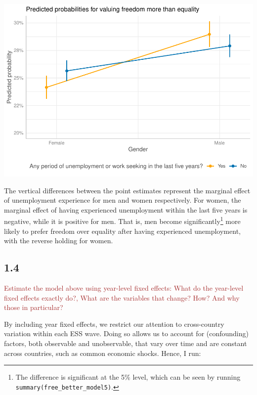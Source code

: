 \documentclass[
]{article}
\begin{document}
\includegraphics{AVCD-Assignment3-Edenhofer_files/figure-latex/predicted-probabilities-plot-1.pdf}

The vertical differences between the point estimates represent the
marginal effect of unemployment experience for men and women
respectively. For women, the marginal effect of having experienced
unemployment within the last five years is negative, while it is
positive for men. That is, men become significantly\footnote{The
  difference is significant at the 5\% level, which can be seen by
  running \texttt{summary(free\_better\_model5)}.} more likely to prefer
freedom over equality after having experienced unemployment, with the
reverse holding for women.

\hypertarget{section-3}{%
\subsection{1.4}\label{section-3}}

\textcolor{brown}{Estimate the model above using year-level fixed effects: What do the year-level fixed effects exactly do?, What are the variables that change? How? And why those in particular?}

By including year fixed effects, we restrict our attention to
cross-country variation within each ESS wave. Doing so allows us to
account for (confounding) factors, both observable and unobservable,
that vary over time and are constant across countries, such as common
economic shocks. Hence, I run:
\end{document}

